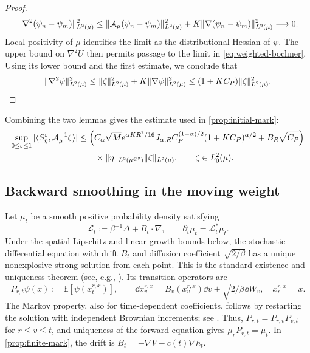 \documentclass[11pt,reqno]{amsart}
\numberwithin{equation}{section}
\theoremstyle{plain}
\theoremstyle{remark}
\DeclarePairedDelimiter{\norm}{\lVert}{\rVert}
\newcommand{\E}{\mathbb E}\newcommand{\Q}{\mathbb Q}\newcommand{\Pb}{\mathbb P}
\newcommand{\Aop}{\mathcal A}
\begin{document}
\begin{proof}
\begin{equation}\label{eq:elliptic-hessian-Cauchy}
 \norm{\nabla^2(\psi_n-\psi_m)}_{L^2(\mu)}^2
 \le\norm{\Aop_\mu(\psi_n-\psi_m)}_{L^2(\mu)}^2
       +K\norm{\nabla(\psi_n-\psi_m)}_{L^2(\mu)}^2\longrightarrow0.
\end{equation}
Local positivity of $\mu$ identifies the limit as the distributional Hessian of $\psi$. The upper bound on $\nabla^2U$ then permits passage to the limit in \eqref{eq:weighted-bochner}. Using its lower bound and the first estimate, we conclude that
\begin{equation}
 \norm{\nabla^2\psi}_{L^2(\mu)}^2
 \le \norm\zeta_{L^2(\mu)}^2+K\norm{\nabla\psi}_{L^2(\mu)}^2
 \le(1+KC_P)\norm\zeta_{L^2(\mu)}^2.
\end{equation}
\end{proof}

Combining the two lemmas gives the estimate used in \cref{prop:initial-mark}:
\begin{align}
 \sup_{0\le\varepsilon\le1}|\langle S_\eta^\varepsilon,\Aop_\mu^{-1}\zeta\rangle|
 &\le\Big(C_\alpha\sqrt M e^{\alpha KR^2/16}J_{\alpha,R}
          C_P^{(1-\alpha)/2}(1+KC_P)^{\alpha/2}
           +B_R\sqrt{C_P}\Big)\notag\\
 &\qquad\times\norm\eta_{L^2(\mu^{\otimes2})}\norm\zeta_{L^2(\mu)},
 \qquad \zeta\in L^2_0(\mu).
 \label{eq:weighted-elliptic-source}
\end{align}

\subsection{Backward smoothing in the moving weight}
Let $\mu_t$ be a smooth positive probability density satisfying
\begin{equation}\label{eq:backward-generator-density}
 \mathcal L_t:=\beta^{-1}\Delta+B_t\cdot\nabla,\qquad
 \partial_t\mu_t=\mathcal L_t^*\mu_t.
\end{equation}
Under the spatial Lipschitz and linear-growth bounds below, the stochastic differential equation with drift $B_t$ and diffusion coefficient $\sqrt{2/\beta}$ has a unique nonexplosive strong solution from each point. This is the standard existence and uniqueness theorem (see, e.g., \cite[Theorem~5.2.1]{Oksendal}). Its transition operators are
\begin{equation}\label{eq:backward-propagator-definition}
 P_{r,t}\psi(x):=\E[\psi(x_t^{r,x})],\qquad
 \dd x_v^{r,x}=B_v(x_v^{r,x})\dd v+\sqrt{2/\beta}\dd W_v,
 \quad x_r^{r,x}=x.
\end{equation}
The Markov property, also for time-dependent coefficients, follows by restarting the solution with independent Brownian increments; see \cite[Section~7.1]{Oksendal}. Thus, $P_{r,t}=P_{r,v}P_{v,t}$ for $r\le v\le t$, and uniqueness of the forward equation gives $\mu_rP_{r,t}=\mu_t$. In \cref{prop:finite-mark}, the drift is $B_t=-\nabla V-c(t)\nabla h_t$.
\end{document}
